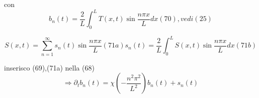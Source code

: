 \documentclass[a4paper,11pt]{report}
\begin{document}
con 
\begin{equation}
b_n(t)=\dfrac{2}{L}\int_0^L T(x,t) \sin \dfrac{n\pi x}{L}dx (70), vedi (25)
\end{equation}

\begin{subequations}
\begin{equation}
S(x,t)=\sum_{n=1}^\infty s_n(t)\sin\dfrac{n\pi x}{L} (71a)
\end{equation}
\begin{equation}
s_n(t)=\dfrac{2}{L}\int_0^L S(x,t) \sin \dfrac{n\pi x}{L}dx (71b)
\end{equation}
\end{subequations}

inserisco (69),(71a) nella (68)
\begin{equation}
\Rightarrow \partial_t b_n(t)=\chi \left(-\dfrac{n^2 \pi^2}{L^2}\right)b_n(t) + s_n(t)
\end{equation}
\end{document}
